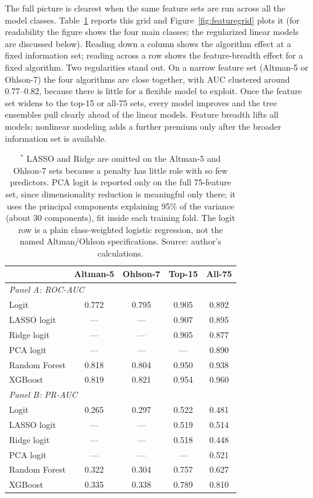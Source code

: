 \documentclass[12pt,a4paper]{article}
\begin{document}
The full picture is clearest when the same feature sets are run across all the
model classes. Table~\ref{tab:feature-grid} reports this
grid and Figure~\ref{fig:featuregrid} plots it (for readability the figure
shows the four main classes; the regularized linear models are discussed
below). Reading down a column shows the
algorithm effect at a fixed information set; reading across a row shows the
feature-breadth effect for a fixed algorithm. Two regularities stand out. On a
narrow feature set (Altman-5 or Ohlson-7) the four algorithms are close
together, with AUC clustered around 0.77--0.82, because there is little for a
flexible model to exploit. Once the feature set widens to the top-15 or all-75
sets, every model improves and the tree ensembles pull clearly ahead of the
linear models. Feature breadth lifts all models; nonlinear modeling adds a
further premium only after the broader information set is available.

\begin{table}[H]
\centering
\caption{Performance by model class and feature set at H1.$^{*}$}
\label{tab:feature-grid}
\small
\begin{tabular}{lcccc}
\toprule
 & Altman-5 & Ohlson-7 & Top-15 & All-75 \\
\midrule
\multicolumn{5}{l}{\textit{Panel A: ROC-AUC}} \\
\midrule
Logit          & 0.772 & 0.795 & 0.905 & 0.892 \\
LASSO logit    & ---   & ---   & 0.907 & 0.895 \\
Ridge logit    & ---   & ---   & 0.905 & 0.877 \\
PCA logit      & ---   & ---   & ---   & 0.890 \\
Random Forest  & 0.818 & 0.804 & 0.950 & 0.938 \\
XGBoost        & 0.819 & 0.821 & 0.954 & 0.960 \\
\midrule
\multicolumn{5}{l}{\textit{Panel B: PR-AUC}} \\
\midrule
Logit          & 0.265 & 0.297 & 0.522 & 0.481 \\
LASSO logit    & ---   & ---   & 0.519 & 0.514 \\
Ridge logit    & ---   & ---   & 0.518 & 0.448 \\
PCA logit      & ---   & ---   & ---   & 0.521 \\
Random Forest  & 0.322 & 0.304 & 0.757 & 0.627 \\
XGBoost        & 0.335 & 0.338 & 0.789 & 0.810 \\
\bottomrule
\end{tabular}
\caption*{\footnotesize $^{*}$ LASSO and Ridge are omitted on the Altman-5 and
Ohlson-7 sets because a penalty has little role with so few predictors. PCA
logit is reported only on the full 75-feature set, since dimensionality
reduction is meaningful only there; it uses the principal components explaining
95\% of the variance (about 30 components), fit inside each training fold. The
logit row is a plain class-weighted logistic regression, not the named
Altman/Ohlson specifications. Source: author's calculations.}
\end{table}
\end{document}
